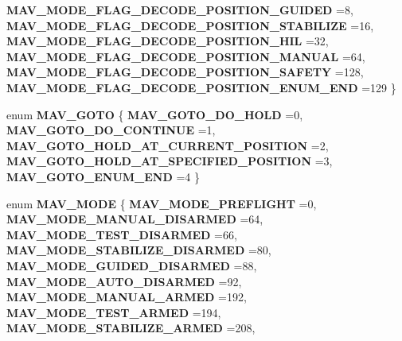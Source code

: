 \begin{DoxyCompactItemize}
\newline
\textbf{ M\+A\+V\+\_\+\+M\+O\+D\+E\+\_\+\+F\+L\+A\+G\+\_\+\+D\+E\+C\+O\+D\+E\+\_\+\+P\+O\+S\+I\+T\+I\+O\+N\+\_\+\+G\+U\+I\+D\+ED} =8, 
\textbf{ M\+A\+V\+\_\+\+M\+O\+D\+E\+\_\+\+F\+L\+A\+G\+\_\+\+D\+E\+C\+O\+D\+E\+\_\+\+P\+O\+S\+I\+T\+I\+O\+N\+\_\+\+S\+T\+A\+B\+I\+L\+I\+ZE} =16, 
\textbf{ M\+A\+V\+\_\+\+M\+O\+D\+E\+\_\+\+F\+L\+A\+G\+\_\+\+D\+E\+C\+O\+D\+E\+\_\+\+P\+O\+S\+I\+T\+I\+O\+N\+\_\+\+H\+IL} =32, 
\textbf{ M\+A\+V\+\_\+\+M\+O\+D\+E\+\_\+\+F\+L\+A\+G\+\_\+\+D\+E\+C\+O\+D\+E\+\_\+\+P\+O\+S\+I\+T\+I\+O\+N\+\_\+\+M\+A\+N\+U\+AL} =64, 
\newline
\textbf{ M\+A\+V\+\_\+\+M\+O\+D\+E\+\_\+\+F\+L\+A\+G\+\_\+\+D\+E\+C\+O\+D\+E\+\_\+\+P\+O\+S\+I\+T\+I\+O\+N\+\_\+\+S\+A\+F\+E\+TY} =128, 
\textbf{ M\+A\+V\+\_\+\+M\+O\+D\+E\+\_\+\+F\+L\+A\+G\+\_\+\+D\+E\+C\+O\+D\+E\+\_\+\+P\+O\+S\+I\+T\+I\+O\+N\+\_\+\+E\+N\+U\+M\+\_\+\+E\+ND} =129
 \}
\item 
enum \textbf{ M\+A\+V\+\_\+\+G\+O\+TO} \{ \newline
\textbf{ M\+A\+V\+\_\+\+G\+O\+T\+O\+\_\+\+D\+O\+\_\+\+H\+O\+LD} =0, 
\textbf{ M\+A\+V\+\_\+\+G\+O\+T\+O\+\_\+\+D\+O\+\_\+\+C\+O\+N\+T\+I\+N\+UE} =1, 
\textbf{ M\+A\+V\+\_\+\+G\+O\+T\+O\+\_\+\+H\+O\+L\+D\+\_\+\+A\+T\+\_\+\+C\+U\+R\+R\+E\+N\+T\+\_\+\+P\+O\+S\+I\+T\+I\+ON} =2, 
\textbf{ M\+A\+V\+\_\+\+G\+O\+T\+O\+\_\+\+H\+O\+L\+D\+\_\+\+A\+T\+\_\+\+S\+P\+E\+C\+I\+F\+I\+E\+D\+\_\+\+P\+O\+S\+I\+T\+I\+ON} =3, 
\newline
\textbf{ M\+A\+V\+\_\+\+G\+O\+T\+O\+\_\+\+E\+N\+U\+M\+\_\+\+E\+ND} =4
 \}
\item 
enum \textbf{ M\+A\+V\+\_\+\+M\+O\+DE} \{ \newline
\textbf{ M\+A\+V\+\_\+\+M\+O\+D\+E\+\_\+\+P\+R\+E\+F\+L\+I\+G\+HT} =0, 
\textbf{ M\+A\+V\+\_\+\+M\+O\+D\+E\+\_\+\+M\+A\+N\+U\+A\+L\+\_\+\+D\+I\+S\+A\+R\+M\+ED} =64, 
\textbf{ M\+A\+V\+\_\+\+M\+O\+D\+E\+\_\+\+T\+E\+S\+T\+\_\+\+D\+I\+S\+A\+R\+M\+ED} =66, 
\textbf{ M\+A\+V\+\_\+\+M\+O\+D\+E\+\_\+\+S\+T\+A\+B\+I\+L\+I\+Z\+E\+\_\+\+D\+I\+S\+A\+R\+M\+ED} =80, 
\newline
\textbf{ M\+A\+V\+\_\+\+M\+O\+D\+E\+\_\+\+G\+U\+I\+D\+E\+D\+\_\+\+D\+I\+S\+A\+R\+M\+ED} =88, 
\textbf{ M\+A\+V\+\_\+\+M\+O\+D\+E\+\_\+\+A\+U\+T\+O\+\_\+\+D\+I\+S\+A\+R\+M\+ED} =92, 
\textbf{ M\+A\+V\+\_\+\+M\+O\+D\+E\+\_\+\+M\+A\+N\+U\+A\+L\+\_\+\+A\+R\+M\+ED} =192, 
\textbf{ M\+A\+V\+\_\+\+M\+O\+D\+E\+\_\+\+T\+E\+S\+T\+\_\+\+A\+R\+M\+ED} =194, 
\newline
\textbf{ M\+A\+V\+\_\+\+M\+O\+D\+E\+\_\+\+S\+T\+A\+B\+I\+L\+I\+Z\+E\+\_\+\+A\+R\+M\+ED} =208, 

\end{DoxyCompactItemize}
